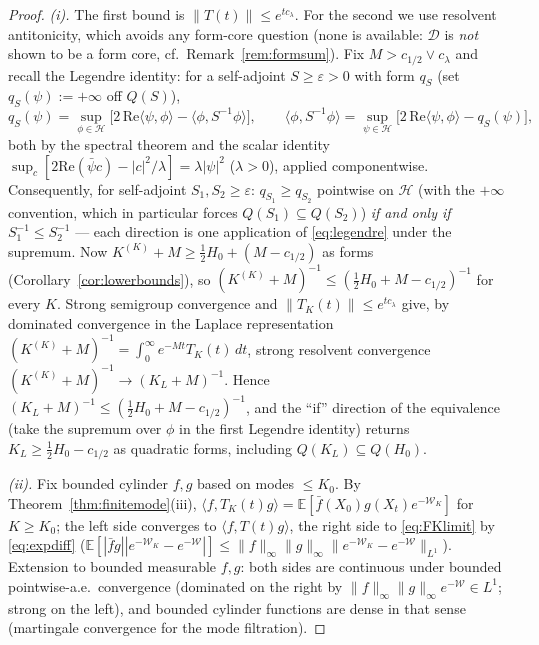 \documentclass[11pt,a4paper]{article}
\theoremstyle{plain}
\theoremstyle{definition}
\newcommand{\E}{\mathbb{E}}
\newcommand{\D}{\mathcal D}
\newcommand{\ip}[2]{\langle #1,#2\rangle}
\newcommand{\HH}{\mathcal H}
\begin{document}
\begin{proof}
\emph{(i).} The first bound is $\|T(t)\|\le e^{tc_\lambda}$. For the second
we use resolvent antitonicity, which avoids any form-core question (none is
available: $\D$ is \emph{not} shown to be a form core, cf.\
Remark~\ref{rem:formsum}). Fix $M>c_{1/2}\vee c_\lambda$ and recall the
Legendre identity: for a self-adjoint $S\ge\varepsilon>0$ with form
$q_S$ (set $q_S(\psi):=+\infty$ off $Q(S)$),
\begin{equation}
 q_S(\psi)=\sup_{\phi\in\HH}\bigl[2\,\mathrm{Re}\ip\psi\phi
 -\ip{\phi}{S^{-1}\phi}\bigr],
 \qquad
 \ip{\phi}{S^{-1}\phi}=\sup_{\psi\in\HH}
 \bigl[2\,\mathrm{Re}\ip\psi\phi-q_S(\psi)\bigr],
 \label{eq:legendre}
\end{equation}
both by the spectral theorem and the scalar identity
$\sup_c[2\mathrm{Re}(\bar\psi c)-|c|^2/\lambda]=\lambda|\psi|^2$
($\lambda>0$), applied componentwise. Consequently, for self-adjoint
$S_1,S_2\ge\varepsilon$: $q_{S_1}\ge q_{S_2}$ pointwise on $\HH$ (with the
$+\infty$ convention, which in particular forces $Q(S_1)\subseteq Q(S_2)$)
\emph{if and only if} $S_1^{-1}\le S_2^{-1}$ --- each direction is one
application of \eqref{eq:legendre} under the supremum. Now
$K^{(K)}+M\ge\tfrac12H_0+(M-c_{1/2})$ as forms
(Corollary~\ref{cor:lowerbounds}), so
$(K^{(K)}+M)^{-1}\le(\tfrac12H_0+M-c_{1/2})^{-1}$ for every $K$. Strong
semigroup convergence and $\|T_K(t)\|\le e^{tc_\lambda}$ give, by dominated
convergence in the Laplace representation
$(K^{(K)}+M)^{-1}=\int_0^\infty e^{-Mt}T_K(t)\,dt$, strong resolvent
convergence $(K^{(K)}+M)^{-1}\to(K_L+M)^{-1}$. Hence
$(K_L+M)^{-1}\le(\tfrac12H_0+M-c_{1/2})^{-1}$, and the ``if''
direction of the equivalence (take the supremum over $\phi$ in the first
Legendre identity) returns
$K_L\ge\tfrac12H_0-c_{1/2}$ as quadratic forms, including
$Q(K_L)\subseteq Q(H_0)$.

\emph{(ii).} Fix bounded cylinder $f,g$ based on modes $\le K_0$. By
Theorem~\ref{thm:finitemode}(iii),
$\ip{f}{T_K(t)g}=\E[\bar f(X_0)g(X_t)e^{-\mathcal W_K}]$ for $K\ge K_0$;
the left side converges to $\ip f{T(t)g}$, the right side to
\eqref{eq:FKlimit} by \eqref{eq:expdiff}
($\E[|\bar fg||e^{-\mathcal W_K}-e^{-\mathcal W}|]\le
\|f\|_\infty\|g\|_\infty\|e^{-\mathcal W_K}-e^{-\mathcal W}\|_{L^1}$).
Extension to bounded measurable $f,g$: both sides are continuous under
bounded pointwise-a.e.\ convergence (dominated on the right by
$\|f\|_\infty\|g\|_\infty e^{-\mathcal W}\in L^1$; strong on the left),
and bounded cylinder functions are dense in that sense (martingale
convergence for the mode filtration).


\end{proof}
\end{document}
